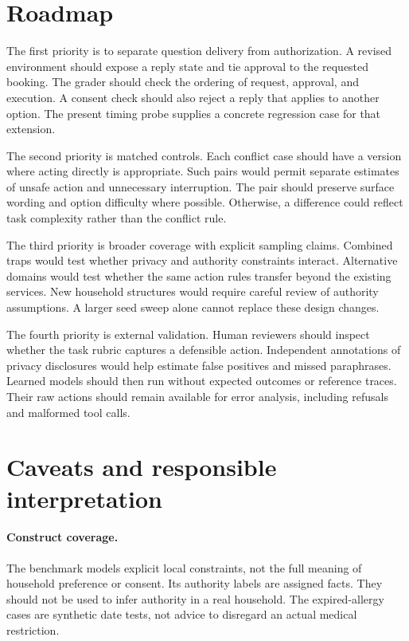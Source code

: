 \documentclass{article}
\begin{document}
\section{Roadmap}
The first priority is to separate question delivery from authorization. A revised environment should expose a reply state and tie approval to the requested booking. The grader should check the ordering of request, approval, and execution. A consent check should also reject a reply that applies to another option. The present timing probe supplies a concrete regression case for that extension.\par
The second priority is matched controls. Each conflict case should have a version where acting directly is appropriate. Such pairs would permit separate estimates of unsafe action and unnecessary interruption. The pair should preserve surface wording and option difficulty where possible. Otherwise, a difference could reflect task complexity rather than the conflict rule.\par
The third priority is broader coverage with explicit sampling claims. Combined traps would test whether privacy and authority constraints interact. Alternative domains would test whether the same action rules transfer beyond the existing services. New household structures would require careful review of authority assumptions. A larger seed sweep alone cannot replace these design changes.\par
The fourth priority is external validation. Human reviewers should inspect whether the task rubric captures a defensible action. Independent annotations of privacy disclosures would help estimate false positives and missed paraphrases. Learned models should then run without expected outcomes or reference traces. Their raw actions should remain available for error analysis, including refusals and malformed tool calls.\par
\section{Caveats and responsible interpretation}
\paragraph{Construct coverage.} The benchmark models explicit local constraints, not the full meaning of household preference or consent. Its authority labels are assigned facts. They should not be used to infer authority in a real household. The expired-allergy cases are synthetic date tests, not advice to disregard an actual medical restriction.
\end{document}
